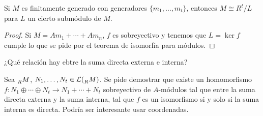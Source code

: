 \begin{cor}
  Si \(M\) es finitamente generado con generadores \(\{m_1, \ldots, m_t\}\),
  entonces \(M\cong R^t/L\) para \(L\) un cierto submódulo de \(M\).
\end{cor}

\begin{proof}
  Si \(M=Am_1+\cdots+Am_n\), \(f\) es sobreyectivo y tenemos que \(L=\ker f\) cumple lo
  que se pide por el teorema de isomorfía para módulos.
\end{proof}

¿Qué relación hay ebtre la suma directa externa e interna?
\begin{ejercicio}\label{ejer:rel_sumas_finito}
  Sea \(\prescript{}{R}{M}\), \(N_1,\ldots,
  N_t\in\mathcal{L}(\prescript{}{R}{M})\). Se pide demostrar que existe
  un homomorfismo \(f:N_1\oplus\cdots\oplus N_t\longrightarrow
  N_1{+}\cdots{+}N_t\)
  sobreyectivo de \(A\)-módulos tal que entre la suma directa
  externa y la suma interna, tal que \(f\) es un isomorfismo si y solo si
  la suma interna es directa. Podría ser interesante usar coordenadas.
\end{ejercicio}